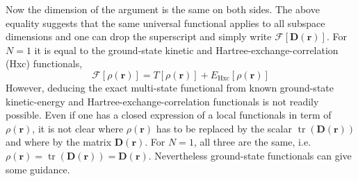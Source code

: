 \documentclass[journal=jpclcd,manuscript=letter]{achemso}
\DeclareMathOperator{\tr}{tr}
\newcommand\m[1]{\mathbf{#1}}
\renewcommand\vec[1]{\mathbf{#1}}
\begin{document}
Now the dimension of the argument is the same on both sides. The above equality suggests that the same universal functional applies to all subspace dimensions and one can drop the superscript and simply write $\m{\mathcal{F}}[\m{D}(\vec{r})]$. For $N=1$ it is equal to the ground-state kinetic and Hartree-exchange-correlation (Hxc) functionals,
\begin{equation}
 \mathcal{F}[\rho(\vec{r})] = T[\rho(\vec{r})] + E_{\text{Hxc}}[\rho(\vec{r})]
\end{equation}
However, deducing the exact multi-state functional from known ground-state kinetic-energy and Hartree-exchange-correlation functionals is not readily possible.
Even if one has a closed expression of a local functionals in term of $\rho(\vec{r})$,
it is not clear where $\rho(\vec{r})$ has to be replaced by the scalar $\tr(\m{D}(\vec{r}))$
and where by the matrix $\m{D}(\vec{r})$.
For $N=1$, all three are the same, i.e. $\rho(\vec{r}) = \tr(\m{D}(\vec{r})) = \m{D}(\vec{r})$.
Nevertheless ground-state functionals can give some guidance.
\end{document}
